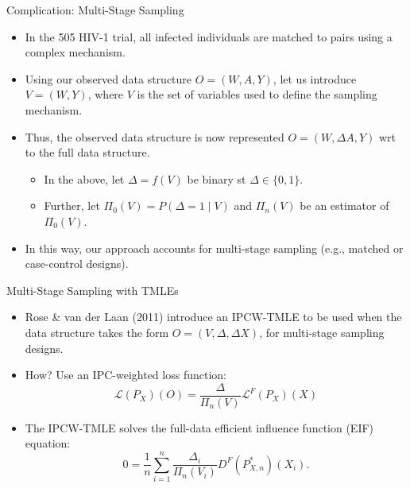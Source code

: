 \documentclass[12pt,t]{beamer}
\newcommand{\lik}{\mathcal{L}}
\begin{document}
\begin{frame}[c]{Complication: Multi-Stage Sampling}

\begin{center}
\begin{itemize}
  \itemsep10pt
  \item In the 505 HIV-1 trial, all infected individuals are matched to pairs
    using a complex mechanism.
  \item Using our observed data structure $O = (W,A,Y)$, let us introduce $V =
    (W,Y)$, where $V$ is the set of variables used to define the sampling
    mechanism.
  \item Thus, the observed data structure is now represented $O = (W, \Delta A,
    Y)$ wrt to the full data structure.
    \begin{itemize}
      \item In the above, let $\Delta = f(V)$ be binary st $\Delta \in \{0,
        1\}$.
      \item Further, let $\Pi_0(V) = P(\Delta = 1 \mid V)$ and $\Pi_n(V)$ be an
        estimator of $\Pi_0(V)$.
    \end{itemize}
  \item In this way, our approach accounts for multi-stage sampling (e.g.,
    matched or case-control designs).
\end{itemize}
\end{center}

\note{
}

\end{frame}


\begin{frame}[c]{Multi-Stage Sampling with TMLEs}

\begin{center}
\begin{itemize}
  \itemsep10pt
  \item Rose \& van der Laan (2011) introduce an IPCW-TMLE to be used when the
    data structure takes the form $O = (V, \Delta, \Delta X)$, for multi-stage
    sampling designs.
  \item How? Use an IPC-weighted loss function:
    \[
      \lik(P_X)(O) = \frac{\Delta}{\Pi_n(V)}\lik^F(P_X)(X)
    \]
  \item The IPCW-TMLE solves the full-data efficient influence function (EIF)
    equation:
    \[
      0 = \frac{1}{n}\sum_{i = 1}^n
      \frac{\Delta_i}{\Pi_n(V_i)}D^F(P^*_{X,n})(X_i).
    \]
\end{itemize}
\end{center}


\end{frame}
\end{document}
